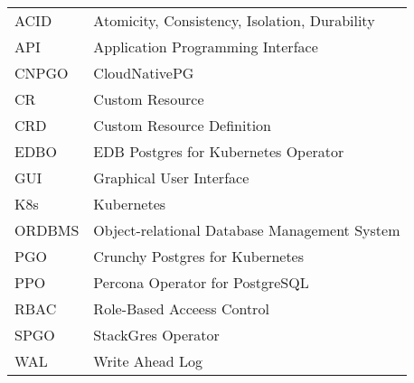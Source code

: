 
\seznamzkr

\begin{tabular}{ll}
  ACID   & Atomicity, Consistency, Isolation, Durability \\
  API    & Application Programming Interface             \\
  CNPGO  & CloudNativePG                                 \\
  CR     & Custom Resource                               \\
  CRD    & Custom Resource Definition                    \\
  EDBO   & EDB Postgres for Kubernetes Operator          \\
  GUI    & Graphical User Interface                      \\
  K8s    & Kubernetes                                    \\
  ORDBMS & Object-relational Database Management System  \\
  PGO    & Crunchy Postgres for Kubernetes               \\
  PPO    & Percona Operator for PostgreSQL               \\
  RBAC   & Role-Based Acceess Control                    \\
  SPGO   & StackGres Operator                            \\
  WAL    & Write Ahead Log                               \\
\end{tabular}

